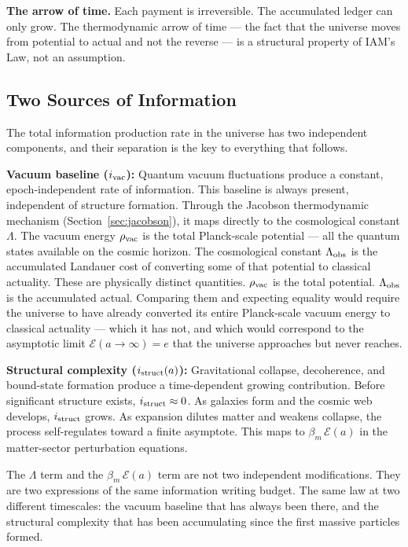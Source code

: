 \documentclass[12pt,a4paper]{article}
\begin{document}
\textbf{The arrow of time.} Each payment is irreversible. The accumulated ledger
can only grow. The thermodynamic arrow of time --- the fact that the universe
moves from potential to actual and not the reverse --- is a structural property
of IAM's Law, not an assumption.

\subsection{Two Sources of Information}

The total information production rate in the universe has two independent
components, and their separation is the key to everything that follows.

\textbf{Vacuum baseline ($i_{\rm vac}$):} Quantum vacuum fluctuations produce a
constant, epoch-independent rate of information. This baseline is always present,
independent of structure formation. Through the Jacobson thermodynamic mechanism
(Section~\ref{sec:jacobson}), it maps directly to the cosmological constant
$\Lambda$. The vacuum energy $\rho_{\rm vac}$ is the total Planck-scale potential
--- all the quantum states available on the cosmic horizon. The cosmological
constant $\Lambda_{\rm obs}$ is the accumulated Landauer cost of converting
some of that potential to classical actuality. These are physically distinct
quantities. $\rho_{\rm vac}$ is the total potential. $\Lambda_{\rm obs}$ is
the accumulated actual. Comparing them and expecting equality would require the
universe to have already converted its entire Planck-scale vacuum energy to
classical actuality --- which it has not, and which would correspond to the
asymptotic limit $\mathcal{E}(a \to \infty) = e$ that the universe approaches
but never reaches.

\textbf{Structural complexity ($i_{\rm struct}(a)$):} Gravitational collapse,
decoherence, and bound-state formation produce a time-dependent growing
contribution. Before significant structure exists, $i_{\rm struct} \approx 0$.
As galaxies form and the cosmic web develops, $i_{\rm struct}$ grows. As
expansion dilutes matter and weakens collapse, the process self-regulates
toward a finite asymptote. This maps to $\beta_m\,\mathcal{E}(a)$ in the
matter-sector perturbation equations.

The $\Lambda$ term and the $\beta_m\,\mathcal{E}(a)$ term are not two independent
modifications. They are two expressions of the same information writing budget.
The same law at two different timescales: the vacuum baseline that has always
been there, and the structural complexity that has been accumulating since
the first massive particles formed.
\end{document}
